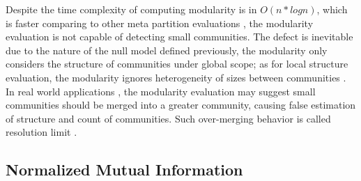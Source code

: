 \documentclass[12pt]{article}
\begin{document}
Despite the time complexity of computing modularity is in $O(n*log n)$, which is faster comparing to other meta partition evaluations \cite{2, 12}, the modularity evaluation is not capable of detecting small communities. The defect is inevitable due to the nature of the null model defined previously, the modularity only considers the structure of communities under global scope; as for local structure evaluation, the modularity ignores heterogeneity of sizes between communities \cite{13}. In real world applications \cite{9, 10}, the modularity evaluation may suggest small communities should be merged into a greater community, causing false estimation of structure and count of communities. Such over-merging behavior is called resolution limit \cite{13}.


\subsection{Normalized Mutual Information}

\end{document}
